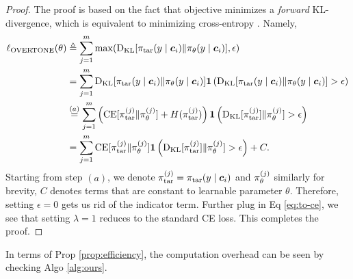 \begin{proof}
The proof is based on the fact that {\NAME} objective minimizes a \textit{forward} KL-divergence, which is equivalent to minimizing cross-entropy \citep{cover1999elements,bishop2006pattern}. 
Namely,
\begin{align}
\notag
\ell_{\text{OVERTONE}}(\theta)
&\triangleq 
\notag
\sum_{j=1}^m \max(\text{D}_\text{KL} [\pi_\text{tar} (y \mid {\boldsymbol{c}}_i) \| \pi_\theta(y \mid {\boldsymbol{c}}_i)], \epsilon) \\
&=
\notag
\sum_{j=1}^m \text{D}_\text{KL} [\pi_\text{tar} (y \mid {\boldsymbol{c}}_i) \| \pi_\theta(y \mid {\boldsymbol{c}}_i)] \boldsymbol{1}\left (\text{D}_\text{KL} [\pi_\text{tar} (y \mid {\boldsymbol{c}}_i) \| \pi_\theta(y \mid {\boldsymbol{c}}_i)] > \epsilon \right) \\
&\overset{(a)}{=} 
\notag
\sum_{j=1}^m \left(\text{CE} [\pi_\text{tar}^{(j)} \| \pi_\theta^{(j)}] + H (\pi_\text{tar}^{(j)}) \right) \boldsymbol{1}\left (\text{D}_\text{KL} [\pi_\text{tar}^{(j)}] \| \pi_\theta^{(j)}] > \epsilon \right) \\ 
&= 
\label{eq: overtone final}
\sum_{j=1}^m \text{CE} [\pi_\text{tar}^{(j)} \| \pi_\theta^{(j)}] \boldsymbol{1}\left (\text{D}_\text{KL} [\pi_\text{tar}^{(j)}] \| \pi_\theta^{(j)}] > \epsilon \right) + C. 
\end{align}
% 
Starting from step $(a)$, we denote $\pi_\text{tar}^{(j)} = \pi_\text{tar} (y \mid {\boldsymbol{c}}_i)$ and $\pi_\theta^{(j)}$ similarly for brevity, $C$ denotes terms that are constant to learnable parameter $\theta$. 
Therefore, setting $\epsilon = 0$ gets us rid of the indicator term. Further plug in Eq \eqref{eq:to-ce}, we see that setting $\lambda = 1$ reduces to the standard CE loss. This completes the proof. 

\end{proof}




In terms of Prop \ref{prop:efficiency}, the computation overhead can be seen by checking Algo \ref{alg:ours}. 

